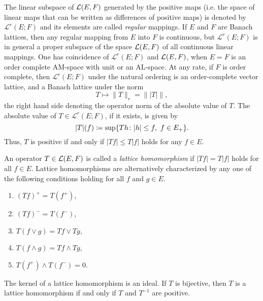 The linear subspace of $ \mathcal{L}(E,F) $ generated by the positive maps (i.e. the space of linear maps that can be written as differences of positive maps) is denoted by $ \mathcal{L}^{r}(E;F) $ and its elements are called \emph{regular} mappings.
If $ E $ and $ F $ are Banach lattices, then any regular mapping from $ E $ into $ F $ is continuous, but  $ \mathcal{L}^{r}(E;F) $ is in general a proper subspace of the space $ \mathcal{L}(E,F) $ of all continuous linear mappings.
One has coincidence of $ \mathcal{L}^{r}(E;F) $ and $ \mathcal{L}(E,F) $, \eg when $ E = F $ is an order complete AM-space with unit or an AL-space.
At any rate, if $ F $ is order complete, then $ \mathcal{L}^{r}(E;F) $ under the natural ordering is an order-complete vector lattice, and a Banach lattice under the norm
\[
	T \mapsto \|T\|_{r} = \| |T| \|,
\]
the right hand side denoting the operator norm of the absolute value of $ T $.
The absolute value of $ T \in  \mathcal{L}^{r}(E;F) $, if it exists, is given by
\[
	|T|(f) \coloneqq \sup\{ Th \colon |h| \leq f , \text{ $ f \in E_{+} $} \} . 
\]
Thus, $ T $ is positive if and only if $ |Tf| \leq T|f| $ holds for any $ f \in E $.

An operator $ T \in \mathcal{L}(E,F) $ is called a \emph{lattice homomorphism} if $ |Tf| = T|f| $ holds for all $ f \in E $.
Lattice homomorphisms are alternatively characterized by any one of the following conditions holding for all $ f $ and $ g \in E $.
\begin{enumerate}[\upshape (i)]

    \item 
    $(Tf)^{+} = T(f^{+})$,
    
    \item 
    $(Tf)^{-} = T(f^{-})$,
    
    \item 
    $T(f\vee g) = Tf\vee Tg$,
    
    \item 
    $T(f\wedge g) = Tf\wedge Tg$,
    
    \item 
    $T(f^{+})\wedge T(f^{-}) = 0$.

\end{enumerate}
The kernel of a lattice homomorphism is an ideal.
If $ T $ is bijective, then $ T $ is a lattice homomorphism if and only if $ T $ and $ T^{-1} $ are positive.
